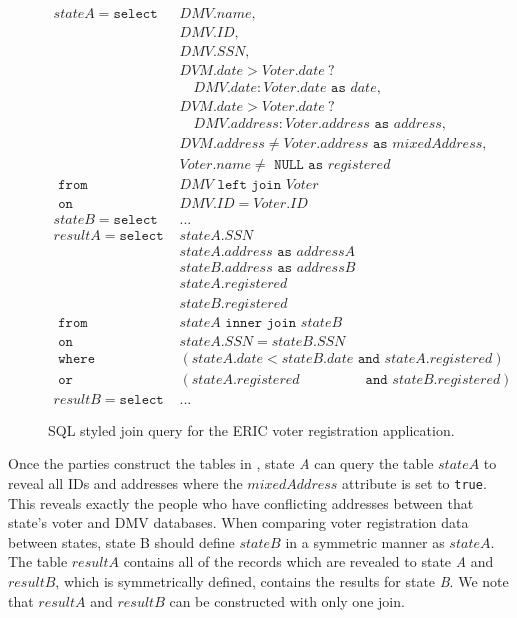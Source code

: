 \begin{figure}[ht]
	
	{
		\scriptsize
		\begin{align*}	
		stateA = \texttt{select }& DMV.name,\\
		& DMV.ID, \\
		& DMV.SSN, \\
		& DVM.date > Voter.date \ ?\\
		&\quad DMV.date : Voter.date \texttt{ as } date,\\
		& DVM.date > Voter.date \ ?\\
		&\quad  DMV.address : Voter.address \texttt{ as } address,\\
		& DVM.address \neq Voter.address \texttt{ as } mixedAddress, \\ 
		& Voter.name \neq \texttt{ NULL as } registered \\
		\texttt{ from } & DMV \texttt{ left join } Voter \\
		\texttt{ on } & DMV.ID = Voter.ID \\
		stateB = \texttt{select }&...\\
		resultA = \texttt{select } & stateA.SSN \\
		& stateA.address \texttt{ as } addressA\\
		& stateB.address \texttt{ as } addressB\\
		& stateA.registered \\
		& stateB.registered \\
		\texttt{ from } & stateA \texttt{ inner join } stateB \\
		\texttt{ on } & stateA.SSN = stateB.SSN\\
		\texttt{ where } & (stateA.date < stateB.date \texttt{ and } stateA.registered ) \\
		\texttt{ or } & (stateA.registered \qquad \qquad \ \, \texttt{ and }stateB.registered )\\
		resultB = \texttt{select } & ...
		\end{align*}
	}
	\caption{SQL styled join query for the ERIC voter registration application. \label{fig:voterQuery}}
\end{figure}

Once the parties construct the tables in , state \emph{A} can query the table $stateA$ to reveal all IDs and addresses where the $mixedAddress$ attribute is set to \texttt{true}. This reveals exactly the people who have conflicting addresses between that state's voter and DMV databases. When comparing voter registration data between states, state B should define $stateB$ in a symmetric manner as $stateA$. The table $resultA$ contains all of the records which are revealed to state \emph{A} and $resultB$, which is symmetrically defined, contains the results for state \emph{B}. We note that $resultA$ and $resultB$ can be constructed with only one join.


